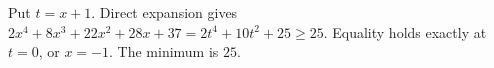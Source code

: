 Put $t=x+1$. Direct expansion gives $2x^4+8x^3+22x^2+28x+37=2t^4+10t^2+25\ge25$. Equality holds exactly at $t=0$, or $x=-1$. The minimum is $\boxed{25}$.
